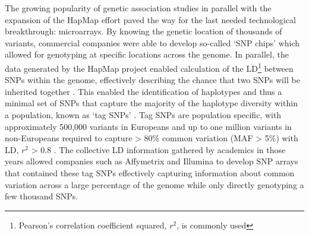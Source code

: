 The growing popularity of genetic association studies in parallel with the expansion of the HapMap effort paved the way for the last needed technological breakthrough: microarrays.
By knowing the genetic location of thousands of variants, commercial companies were able to develop so-called `SNP chips' \cite{meaburn2006genotyping, oliphant2002beadarray} which allowed for genotyping at specific locations across the genome.
In parallel, the data generated by the HapMap project enabled calculation of the LD\footnote{Pearson's correlation coefficient squared, $r^2$, is commonly used} between SNPs within the genome, effectively describing the chance that two SNPs will be inherited together \cite{bush2012genome}.
This enabled the identification of haplotypes and thus a minimal set of SNPs that capture the majority of the haplotype diversity 
within a population, known as `tag SNPs' \cite{international2003international}. 
Tag SNPs are population specific, with approximately 500,000 variants in Europeans and up to one million variants in non-Europeans required to capture > 80\% common variation (MAF > 5\%) with LD, $r^2$ > 0.8 \cite{bush2012genome, visscher2012five}.
The collective LD information gathered by academics in those years \cite{slatkin2008linkage, pe2006evaluating, otto2002resolving} allowed companies such as Affymetrix and Illumina to develop SNP arrays that contained 
these tag SNPs
effectively capturing information about common variation 
across a large percentage of the genome while only directly genotyping a few thousand SNPs.\\


